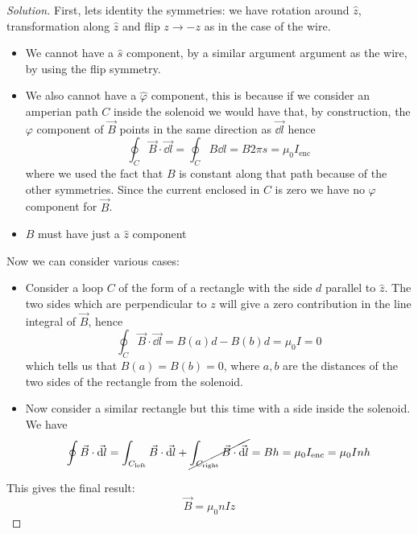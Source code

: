 \documentclass[12pt]{extarticle}
\begin{document}
\begin{proof}[Solution]
	First, lets identity the symmetries:
	we have rotation around $\hat z$, transformation along $\hat z$ and flip $z \to -z$ as in the case of the wire.

	\begin{itemize}
		\item We cannot have a $\hat s$ component, by a similar argument argument as the wire, by using the flip symmetry.
		\item We also cannot have a $\hat \varphi$ component, this is because if we consider an amperian path $C$
		      inside the solenoid we would have that, by construction, the $\varphi$ component of $\vec B$ points in the same direction
		      as $\vec{\dd l}$ hence
		      \begin{equation}
			      \oint_C \vec B \cdot \vec{\dd l} = \oint_C B \dd{l} = B 2\pi s = \mu_0 I_\text{enc}
		      \end{equation}
		      where we used the fact that $B$ is constant along that path because of the other symmetries.
		      Since the current enclosed in $C$ is zero we have no $\varphi$ component for $\vec B$.
		\item $B$ must have just a $\hat z$ component
	\end{itemize}

	Now we can consider various cases:
	\begin{itemize}
		\item Consider a loop $C$ of the form of a rectangle with the side $d$ parallel to $\hat z$.
		      The two sides which are perpendicular to $z$ will give a zero contribution in the line integral of $\vec B$,
		      hence
		      \begin{equation}
			      \oint_C \vec B \cdot \vec{\dd l} = B(a) d - B(b) d = \mu_0 I = 0
		      \end{equation}
		      which tells us that $B(a) = B(b) = 0$, where $a, b$ are the distances of the two sides of the rectangle from the solenoid.

		\item Now consider a similar rectangle but this time with a side inside the solenoid.
		      We have
		      \begin{equation}
			      \oint \vec B \cdot \vec{\dd l} = \int_{C_\text{left}} \vec B \cdot \vec{\dd l} +\cancel{\int_{C_\text{right}} \vec B \cdot \vec{\dd l}} = B h = \mu_0 I_\text{enc} = \mu_0 I n h
		      \end{equation}
	\end{itemize}

	This gives the final result:
	\begin{equation}
		\vec B = \mu_0 n I \hat z
	\end{equation}
\end{proof}
\end{document}

